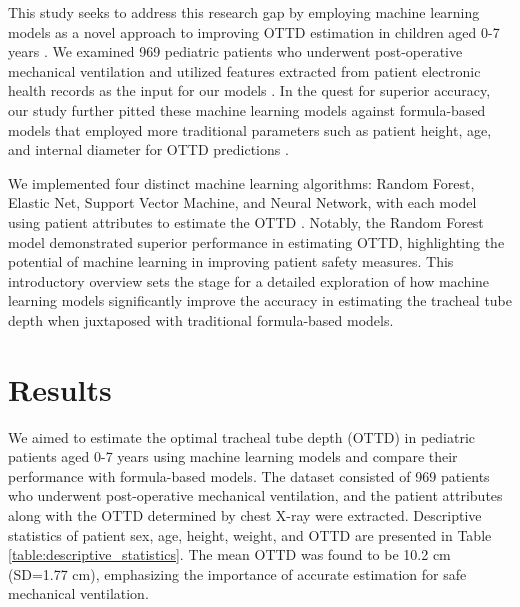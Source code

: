 \documentclass[11pt]{article}
\begin{document}
This study seeks to address this research gap by employing machine learning models as a novel approach to improving OTTD estimation in children aged 0-7 years \cite{Ingelse2017EarlyFO, Steurer2018AlteredMI, Shaw2016DysbiosisIA}. We examined 969 pediatric patients who underwent post-operative mechanical ventilation and utilized features extracted from patient electronic health records as the input for our models \cite{OBoyle2014DevelopmentOL, Weiss2005AppropriatePO, Newth2017VariabilityIU}. In the quest for superior accuracy, our study further pitted these machine learning models against formula-based models that employed more traditional parameters such as patient height, age, and internal diameter for OTTD predictions \cite{Mariano2005ACO, Takita2003TheHF}. 

We implemented four distinct machine learning algorithms: Random Forest, Elastic Net, Support Vector Machine, and Neural Network, with each model using patient attributes to estimate the OTTD \cite{Shaw2016DysbiosisIA}. Notably, the Random Forest model demonstrated superior performance in estimating OTTD, highlighting the potential of machine learning in improving patient safety measures. This introductory overview sets the stage for a detailed exploration of how machine learning models significantly improve the accuracy in estimating the tracheal tube depth when juxtaposed with traditional formula-based models.

\section*{Results}

We aimed to estimate the optimal tracheal tube depth (OTTD) in pediatric patients aged 0-7 years using machine learning models and compare their performance with formula-based models. The dataset consisted of 969 patients who underwent post-operative mechanical ventilation, and the patient attributes along with the OTTD determined by chest X-ray were extracted. Descriptive statistics of patient sex, age, height, weight, and OTTD are presented in Table {}\ref{table:descriptive_statistics}. The mean OTTD was found to be 10.2 cm (SD=1.77 cm), emphasizing the importance of accurate estimation for safe mechanical ventilation.
\end{document}

